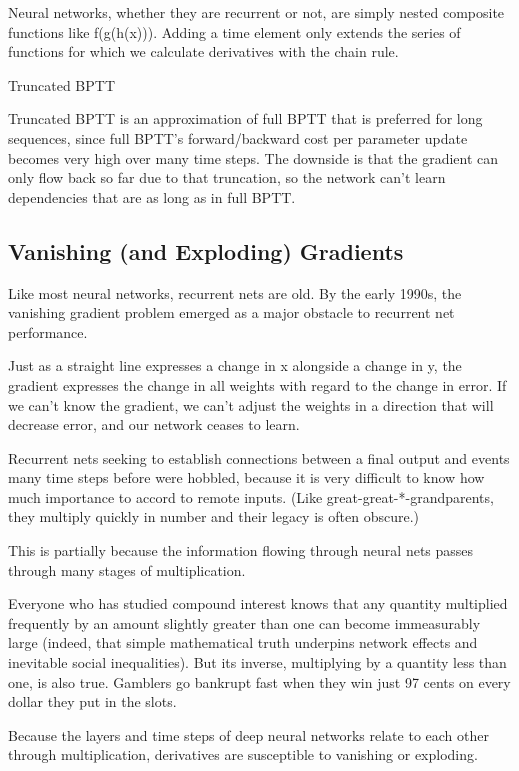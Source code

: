 {Neural networks, whether they are recurrent or not, are simply nested composite functions like f(g(h(x))). Adding a time element only extends the series of functions for which we calculate derivatives with the chain rule.

Truncated BPTT

Truncated BPTT is an approximation of full BPTT that is preferred for long sequences, since full BPTT’s forward/backward cost per parameter update becomes very high over many time steps. The downside is that the gradient can only flow back so far due to that truncation, so the network can’t learn dependencies that are as long as in full BPTT.

\subsection{Vanishing (and Exploding) Gradients}
Like most neural networks, recurrent nets are old. By the early 1990s, the vanishing gradient problem emerged as a major obstacle to recurrent net performance.

Just as a straight line expresses a change in x alongside a change in y, the gradient expresses the change in all weights with regard to the change in error. If we can’t know the gradient, we can’t adjust the weights in a direction that will decrease error, and our network ceases to learn.

Recurrent nets seeking to establish connections between a final output and events many time steps before were hobbled, because it is very difficult to know how much importance to accord to remote inputs. (Like great-great-*-grandparents, they multiply quickly in number and their legacy is often obscure.)

This is partially because the information flowing through neural nets passes through many stages of multiplication.

Everyone who has studied compound interest knows that any quantity multiplied frequently by an amount slightly greater than one can become immeasurably large (indeed, that simple mathematical truth underpins network effects and inevitable social inequalities). But its inverse, multiplying by a quantity less than one, is also true. Gamblers go bankrupt fast when they win just 97 cents on every dollar they put in the slots.

Because the layers and time steps of deep neural networks relate to each other through multiplication, derivatives are susceptible to vanishing or exploding.

}
